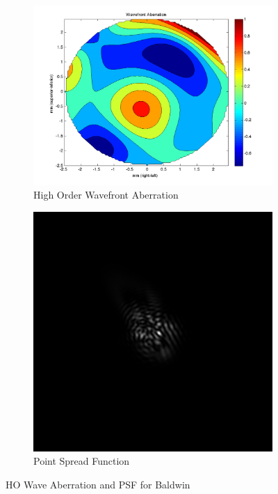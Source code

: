 \documentclass{article}
\begin{document}
\begin{figure}[H]
\begin{subfigure}{.5\textwidth}
  \centering
  \includegraphics[width=1\linewidth]{Baldwin_WFA.png}
  \caption{High Order Wavefront Aberration}
  \label{fig:baldwinhowa}
\end{subfigure}%
\begin{subfigure}{.5\textwidth}
  \centering
  \includegraphics[width=.8\linewidth]{Baldwin_PSF.png}
  \caption{Point Spread Function}
  \label{fig:baldwinpsf}
\end{subfigure}
\caption{HO Wave Aberration and PSF for Baldwin}
\label{fig:baldwin}
\end{figure}
\end{document}

